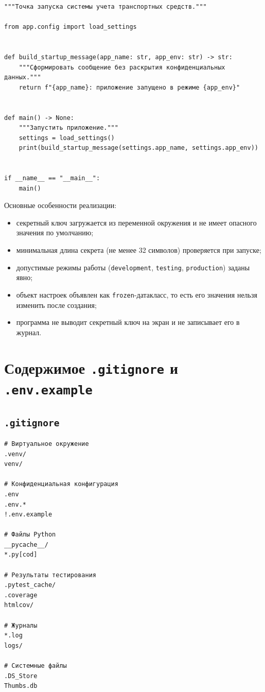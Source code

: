 \documentclass[12pt,a4paper]{article}
\begin{document}
\begin{lstlisting}
"""Точка запуска системы учета транспортных средств."""

from app.config import load_settings


def build_startup_message(app_name: str, app_env: str) -> str:
    """Сформировать сообщение без раскрытия конфиденциальных данных."""
    return f"{app_name}: приложение запущено в режиме {app_env}"


def main() -> None:
    """Запустить приложение."""
    settings = load_settings()
    print(build_startup_message(settings.app_name, settings.app_env))


if __name__ == "__main__":
    main()
\end{lstlisting}

Основные особенности реализации:

\begin{itemize}
\item секретный ключ загружается из переменной окружения и не имеет опасного значения по умолчанию;
\item минимальная длина секрета (не менее 32 символов) проверяется при запуске;
\item допустимые режимы работы (\texttt{development}, \texttt{testing}, \texttt{production}) заданы явно;
\item объект настроек объявлен как \texttt{frozen}-датакласс, то есть его значения нельзя изменить после создания;
\item программа не выводит секретный ключ на экран и не записывает его в журнал.
\end{itemize}
\section{Содержимое \texttt{.\allowbreak{}gitignore} и \texttt{.\allowbreak{}env.\allowbreak{}example}}

\subsection{\texttt{.\allowbreak{}gitignore}}

\begin{lstlisting}
# Виртуальное окружение
.venv/
venv/

# Конфиденциальная конфигурация
.env
.env.*
!.env.example

# Файлы Python
__pycache__/
*.py[cod]

# Результаты тестирования
.pytest_cache/
.coverage
htmlcov/

# Журналы
*.log
logs/

# Системные файлы
.DS_Store
Thumbs.db
\end{lstlisting}
\end{document}
